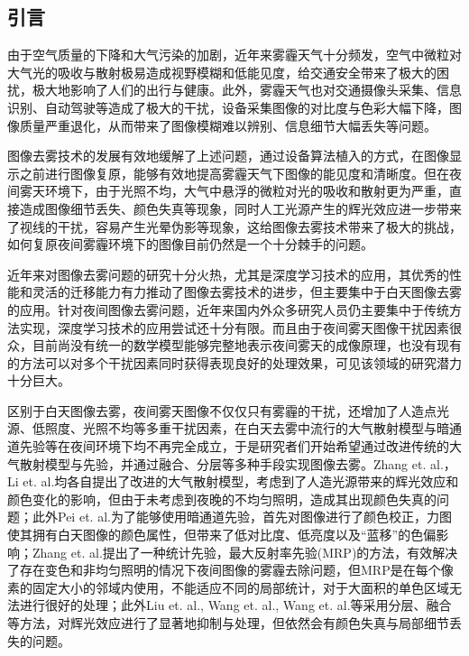 \begin{multicols}{2} 
\section{引言}\label{chpt:1}%

由于空气质量的下降和大气污染的加剧，近年来雾霾天气十分频发，空气中微粒对大气光的吸收与散射极易造成视野模糊和低能见度，给交通安全带来了极大的困扰，极大地影响了人们的出行与健康。此外，雾霾天气也对交通摄像头采集、信息识别、自动驾驶等造成了极大的干扰，设备采集图像的对比度与色彩大幅下降，图像质量严重退化，从而带来了图像模糊难以辨别、信息细节大幅丢失等问题。

图像去雾技术的发展有效地缓解了上述问题，通过设备算法植入的方式，在图像显示之前进行图像复原，能够有效地提高雾霾天气下图像的能见度和清晰度。但在夜间雾天环境下，由于光照不均，大气中悬浮的微粒对光的吸收和散射更为严重，直接造成图像细节丢失、颜色失真等现象，同时人工光源产生的辉光效应进一步带来了视线的干扰，容易产生光晕伪影等现象，这给图像去雾技术带来了极大的挑战，如何复原夜间雾霾环境下的图像目前仍然是一个十分棘手的问题。

近年来对图像去雾问题的研究十分火热，尤其是深度学习技术的应用，其优秀的性能和灵活的迁移能力有力推动了图像去雾技术的进步，但主要集中于白天图像去雾的应用。针对夜间图像去雾问题，近年来国内外众多研究人员仍主要集中于传统方法实现，深度学习技术的应用尝试还十分有限。而且由于夜间雾天图像干扰因素很众，目前尚没有统一的数学模型能够完整地表示夜间雾天的成像原理，也没有现有的方法可以对多个干扰因素同时获得表现良好的处理效果，可见该领域的研究潜力十分巨大。

区别于白天图像去雾，夜间雾天图像不仅仅只有雾霾的干扰，还增加了人造点光源、低照度、光照不均等多重干扰因素，在白天去雾中流行的大气散射模型与暗通道先验等在夜间环境下均不再完全成立，于是研究者们开始希望通过改进传统的大气散射模型与先验，并通过融合、分层等多种手段实现图像去雾。Zhang et. al.，Li et. al.均各自提出了改进的大气散射模型，考虑到了人造光源带来的辉光效应和颜色变化的影响，但由于未考虑到夜晚的不均匀照明，造成其出现颜色失真的问题；此外Pei et. al.为了能够使用暗通道先验，首先对图像进行了颜色校正，力图使其拥有白天图像的颜色属性，但带来了低对比度、低亮度以及“蓝移”的色偏影响；Zhang et. al.提出了一种统计先验，最大反射率先验(MRP)的方法，有效解决了存在变色和非均匀照明的情况下夜间图像的雾霾去除问题，但MRP是在每个像素的固定大小的邻域内使用，不能适应不同的局部统计，对于大面积的单色区域无法进行很好的处理；此外Liu et. al., Wang et. al., Wang et. al.等采用分层、融合等方法，对辉光效应进行了显著地抑制与处理，但依然会有颜色失真与局部细节丢失的问题。


\end{multicols}
